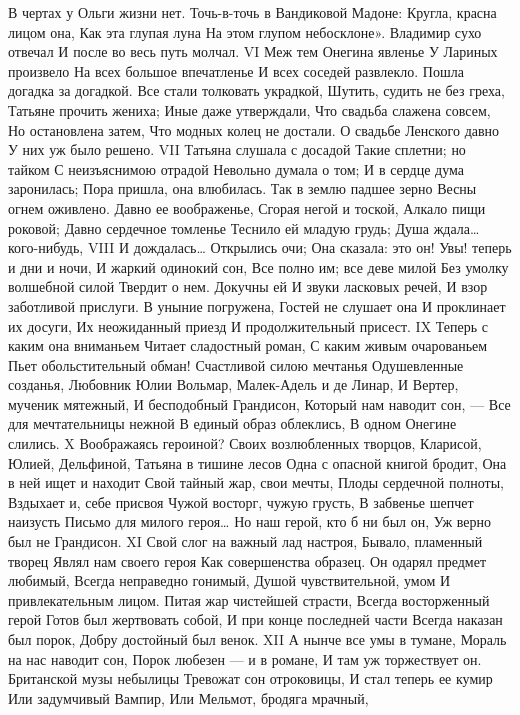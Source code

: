 В чертах у Ольги жизни нет.
Точь-в-точь в Вандиковой Мадоне:
Кругла, красна лицом она,
Как эта глупая луна
На этом глупом небосклоне».
Владимир сухо отвечал
И после во весь путь молчал.
VI
Меж тем Онегина явленье
У Лариных произвело
На всех большое впечатленье
И всех соседей развлекло.
Пошла догадка за догадкой.
Все стали толковать украдкой,
Шутить, судить не без греха,
Татьяне прочить жениха;
Иные даже утверждали,
Что свадьба слажена совсем,
Но остановлена затем,
Что модных колец не достали.
О свадьбе Ленского давно
У них уж было решено.
VII
Татьяна слушала с досадой
Такие сплетни; но тайком
С неизъяснимою отрадой
Невольно думала о том;
И в сердце дума заронилась;
Пора пришла, она влюбилась.
Так в землю падшее зерно
Весны огнем оживлено.
Давно ее воображенье,
Сгорая негой и тоской,
Алкало пищи роковой;
Давно сердечное томленье
Теснило ей младую грудь;
Душа ждала… кого-нибудь,
VIII
И дождалась… Открылись очи;
Она сказала: это он!
Увы! теперь и дни и ночи,
И жаркий одинокий сон,
Все полно им; все деве милой
Без умолку волшебной силой
Твердит о нем. Докучны ей
И звуки ласковых речей,
И взор заботливой прислуги.
В уныние погружена,
Гостей не слушает она
И проклинает их досуги,
Их неожиданный приезд
И продолжительный присест.
IX
Теперь с каким она вниманьем
Читает сладостный роман,
С каким живым очарованьем
Пьет обольстительный обман!
Счастливой силою мечтанья
Одушевленные созданья,
Любовник Юлии Вольмар,
Малек-Адель и де Линар,
И Вертер, мученик мятежный,
И бесподобный Грандисон,
Который нам наводит сон, —
Все для мечтательницы нежной
В единый образ облеклись,
В одном Онегине слились.
X
Воображаясь героиной?
Своих возлюбленных творцов,
Кларисой, Юлией, Дельфиной,
Татьяна в тишине лесов
Одна с опасной книгой бродит,
Она в ней ищет и находит
Свой тайный жар, свои мечты,
Плоды сердечной полноты,
Вздыхает и, себе присвоя
Чужой восторг, чужую грусть,
В забвенье шепчет наизусть
Письмо для милого героя…
Но наш герой, кто б ни был он,
Уж верно был не Грандисон.
XI
Свой слог на важный лад настроя,
Бывало, пламенный творец
Являл нам своего героя
Как совершенства образец.
Он одарял предмет любимый,
Всегда неправедно гонимый,
Душой чувствительной, умом
И привлекательным лицом.
Питая жар чистейшей страсти,
Всегда восторженный герой
Готов был жертвовать собой,
И при конце последней части
Всегда наказан был порок,
Добру достойный был венок.
XII
А нынче все умы в тумане,
Мораль на нас наводит сон,
Порок любезен — и в романе,
И там уж торжествует он.
Британской музы небылицы
Тревожат сон отроковицы,
И стал теперь ее кумир
Или задумчивый Вампир,
Или Мельмот, бродяга мрачный,
